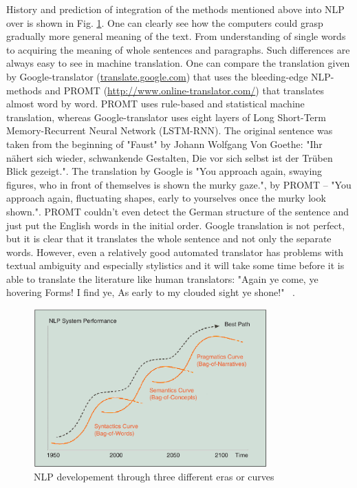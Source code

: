 History and prediction of integration of the methods mentioned above into NLP over is shown in Fig. \ref{fig:NLPLevels}. One can clearly see how the computers could grasp gradually more general meaning of the text. From understanding of single words to acquiring the meaning of whole sentences and paragraphs. Such differences are always easy to see in machine translation. One can compare the translation given by Google-translator (\url{translate.google.com}) that uses the bleeding-edge NLP-methods and PROMT (\url{http://www.online-translator.com/}) that translates almost word by word. PROMT uses rule-based and statistical machine translation, whereas Google-translator uses eight layers of Long Short-Term Memory-Recurrent Neural Network (LSTM-RNN). The original sentence was taken from the beginning of "Faust" by Johann Wolfgang Von Goethe: "Ihr n{\"a}hert sich wieder, schwankende Gestalten, Die vor sich selbst ist der Tr{\"u}ben Blick gezeigt.". The translation by Google is "You approach again, swaying figures, who in front of themselves is shown the murky gaze.", by PROMT -- "You approach again, fluctuating shapes, early to yourselves once the murky look shown.". PROMT couldn't even detect the German structure of the sentence and just put the English words in the initial order. Google translation is not perfect, but it is clear that it translates the whole sentence and not only the separate words. However, even a relatively good automated translator has problems with textual ambiguity and especially stylistics and it will take some time before it is able to translate the literature like human translators: "Again ye come, ye hovering Forms! I find ye, As early to my clouded sight ye shone!" ~\cite{Faust}.\\ 

\begin{figure}[h!]
  \centering
  \includegraphics[width=0.8\textwidth]{img/NLPLevels}
    \caption{ NLP developement through three different eras or curves ~\cite{Cambria} }\label{fig:NLPLevels}
\end{figure}

